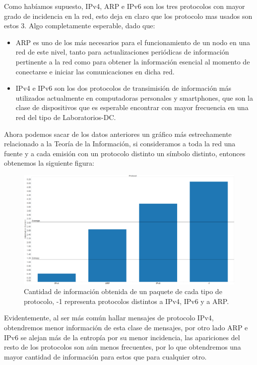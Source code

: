 \documentclass{article}
\theoremstyle{definition}
\theoremstyle{remark}
\begin{document}
Como habíamos supuesto, IPv4, ARP e IPv6 son los tres protocolos con mayor grado de incidencia en la red, esto deja en claro que los protocolo mas usados son estos 3. Algo completamente esperable, dado que:

\begin{itemize}
 
\item ARP es uno de los más necesarios para el funcionamiento de un nodo en una red de este nivel, tanto para actualizaciones periódicas de información pertinente a la red como para obtener la información esencial al momento de conectarse e iniciar las comunicaciones en dicha red.

\item IPv4 e IPv6 son los dos protocolos de transimisión de información más utilizados actualmente en computadoras personales y smartphones, que son la clase de dispositivos que es esperable encontrar con mayor frecuencia en una red del tipo de Laboratorios-DC.

\end{itemize}

Ahora podemos sacar de los datos anteriores un gráfico más estrechamente relacionado a la Teoría de la Información, si consideramos a toda la red una fuente y a cada emisión con un protocolo distinto un símbolo distinto, entonces obtenemos la siguiente figura:

\begin{figure}[H]
\centering
\includegraphics[width=450pt]{captures/LabosDC/Protocol PDF Dashboard.png}
\caption{Cantidad de información obtenida de un paquete de cada tipo de protocolo, -1 representa protocolos distintos a IPv4, IPv6 y a ARP.}
\end{figure}

Evidentemente, al ser más común hallar mensajes de protocolo IPv4, obtendremos menor información de esta clase de mensajes, por otro lado ARP e IPv6 se alejan más de la entropía por su menor incidencia, las apariciones del resto de los protocolos son aún menos frecuentes, por lo que obtendremos una mayor cantidad de información para estos que para cualquier otro.
\end{document}
